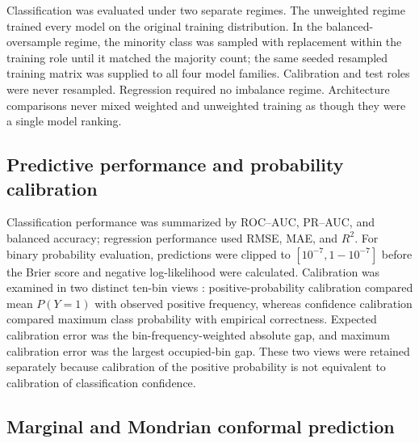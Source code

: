 Classification was evaluated under two separate regimes. The unweighted regime trained every model on the original training distribution. In the balanced-oversample regime, the minority class was sampled with replacement within the training role until it matched the majority count; the same seeded resampled training matrix was supplied to all four model families. Calibration and test roles were never resampled. Regression required no imbalance regime. Architecture comparisons never mixed weighted and unweighted training as though they were a single model ranking.

\subsection{Predictive performance and probability calibration}

Classification performance was summarized by ROC--AUC, PR--AUC, and balanced accuracy; regression performance used RMSE, MAE, and $R^2$. For binary probability evaluation, predictions were clipped to $[10^{-7},1-10^{-7}]$ before the Brier score and negative log-likelihood were calculated. Calibration was examined in two distinct ten-bin views \citep{guo2017calibration}: positive-probability calibration compared mean $P(Y=1)$ with observed positive frequency, whereas confidence calibration compared maximum class probability with empirical correctness. Expected calibration error was the bin-frequency-weighted absolute gap, and maximum calibration error was the largest occupied-bin gap. These two views were retained separately because calibration of the positive probability is not equivalent to calibration of classification confidence.

\subsection{Marginal and Mondrian conformal prediction}

